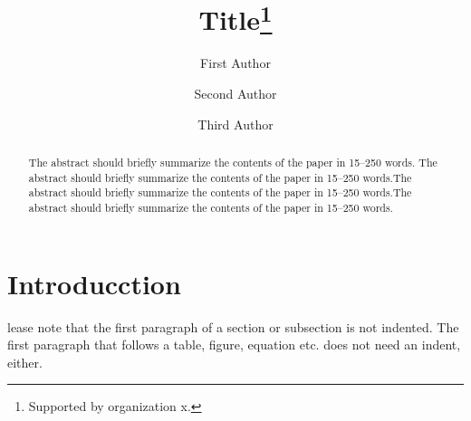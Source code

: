 \documentclass{llncs}
\begin{document}
%
\title{Title\thanks{Supported by organization x.}}
%
%

\author{First Author \and Second Author \and Third Author}

%
%
%
\maketitle              %
\pagestyle{empty}
\thispagestyle{empty}

%
\begin{abstract}
The abstract should briefly summarize the contents of the paper in 15--250 words. The abstract should briefly summarize the contents of the paper in
15--250 words.The abstract should briefly summarize the contents of the paper in
15--250 words.The abstract should briefly summarize the contents of the paper in
15--250 words.

\end{abstract}
%
%
%
\section{Introducction}
lease note that the first paragraph of a section or subsection is not indented. The first paragraph that follows a table, figure, equation etc. does not need an indent, either.
\end{document}
